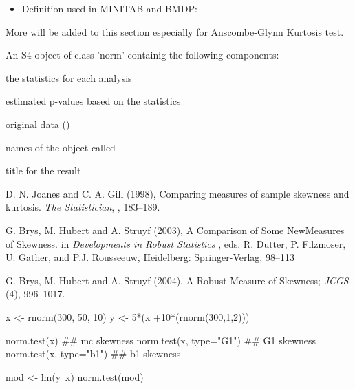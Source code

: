 \documentclass[a4paper]{book}
\begin{document}
\begin{Details}
\begin{itemize}
\end{itemize}
   



\begin{itemize}

\item Definition used in MINITAB and BMDP:


\end{itemize}




More will be added to this section especially for Anscombe-Glynn Kurtosis test.
\end{Details}
%
\begin{Value}
An S4 object of class 'norm' containig the following components:

\begin{ldescription}
\item[\code{statistics}] the statistics for each analysis
\item[\code{p.value}] estimated p-values based on the statistics
\item[\code{data}] original data ()
\item[\code{data.name }] names of the object called
\item[\code{title}] title for the result
\end{ldescription}
\end{Value}
%
\begin{References}\relax
D. N. Joanes and C. A. Gill (1998),
Comparing measures of sample skewness and kurtosis.
\emph{The Statistician}, , 183--189.

G. Brys, M. Hubert and A. Struyf (2003),
A Comparison of Some NewMeasures of Skewness.
in \emph{Developments in Robust Statistics} ,
eds. R. Dutter, P. Filzmoser, U. Gather, and P.J. Rousseeuw, Heidelberg:
Springer-Verlag, 98--113

G. Brys, M. Hubert and A. Struyf (2004),
A Robust Measure of Skewness;
\emph{JCGS}  (4), 996--1017.

\end{References}
%
\begin{Examples}
\begin{ExampleCode}
x <- rnorm(300, 50, 10)
y  <- 5*(x +10*(rnorm(300,1,2)))

norm.test(x)            ## mc skewness
norm.test(x, type="G1") ## G1 skewness
norm.test(x, type="b1") ## b1 skewness

mod <- lm(y~x)
norm.test(mod)

\end{ExampleCode}
\end{Examples}
\end{document}
